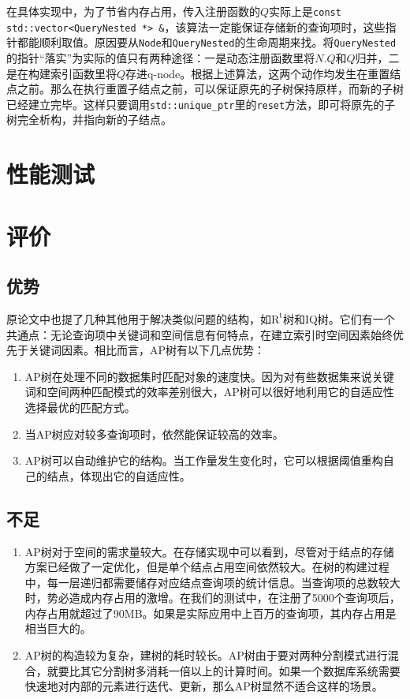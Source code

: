\documentclass[UTF8]{ctexart}
\begin{document}
在具体实现中，为了节省内存占用，传入注册函数的$Q$实际上是\texttt{const std::vector<QueryNested *> \&}，该算法一定能保证存储新的查询项时，这些指针都能顺利取值。原因要从\texttt{Node}和\texttt{QueryNested}的生命周期来找。将\texttt{QueryNested}的指针“落实”为实际的值只有两种途径：一是动态注册函数里将$N.Q$和$Q$归并，二是在构建索引函数里将$Q$存进q-node。根据上述算法，这两个动作均发生在重置结点之前。那么在执行重置子结点之前，可以保证原先的子树保持原样，而新的子树已经建立完毕。这样只要调用\texttt{std::unique\_ptr}里的\texttt{reset}方法，即可将原先的子树完全析构，并指向新的子结点。

\section{性能测试}


\section{评价}
\subsection{优势}
原论文中也提了几种其他用于解决类似问题的结构，如$\mathrm{R^t}$树和IQ树。它们有一个共通点：无论查询项中关键词和空间信息有何特点，在建立索引时空间因素始终优先于关键词因素。相比而言，AP树有以下几点优势：
\begin{enumerate}
    \item AP树在处理不同的数据集时匹配对象的速度快。因为对有些数据集来说关键词和空间两种匹配模式的效率差别很大，AP树可以很好地利用它的自适应性选择最优的匹配方式。
    \item 当AP树应对较多查询项时，依然能保证较高的效率。
    \item AP树可以自动维护它的结构。当工作量发生变化时，它可以根据阈值重构自己的结点，体现出它的自适应性。
\end{enumerate}

\subsection{不足}
\begin{enumerate}
    \item AP树对于空间的需求量较大。在存储实现中可以看到，尽管对于结点的存储方案已经做了一定优化，但是单个结点占用空间依然较大。在树的构建过程中，每一层递归都需要储存对应结点查询项的统计信息。当查询项的总数较大时，势必造成内存占用的激增。在我们的测试中，在注册了5000个查询项后，内存占用就超过了90MB。如果是实际应用中上百万的查询项，其内存占用是相当巨大的。
    \item AP树的构造较为复杂，建树的耗时较长。AP树由于要对两种分割模式进行混合，就要比其它分割树多消耗一倍以上的计算时间。如果一个数据库系统需要快速地对内部的元素进行迭代、更新，那么AP树显然不适合这样的场景。
\end{enumerate}
\end{document}
